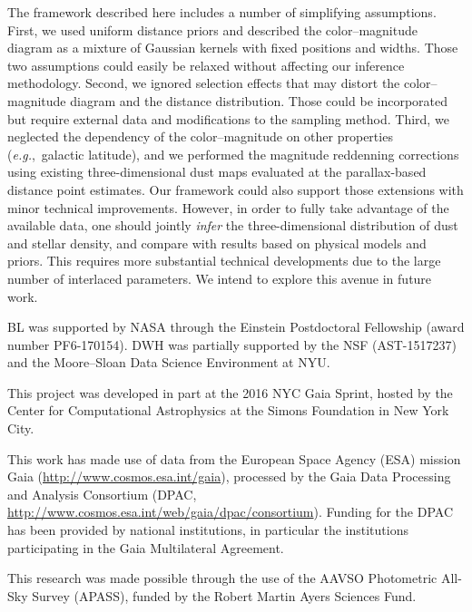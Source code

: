 \documentclass[manuscript, letterpaper]{aastex6}
\newcommand{\eg}{{\textit{e.g.},~}}
\begin{document}
The framework described here includes a number of simplifying assumptions. 
First, we used uniform distance priors and described the color--magnitude diagram as a mixture of Gaussian kernels with fixed positions and widths.
Those two assumptions could easily be relaxed without affecting our inference methodology.
Second, we ignored selection effects that may distort the color--magnitude diagram and the distance distribution.
Those could be incorporated but require external data and modifications to the sampling method.
Third, we neglected the dependency of the color--magnitude on other properties (\eg galactic latitude), and we performed the magnitude reddenning corrections using existing three-dimensional dust maps evaluated at the parallax-based distance point estimates.
Our framework could also support those extensions with minor technical improvements.
However, in order to fully take advantage of the available data, one should jointly \textit{infer} the three-dimensional distribution of dust and stellar density, and compare with results based on physical models and priors.
This requires more substantial technical developments due to the large number of interlaced parameters.
We intend to explore this avenue in future work.


\acknowledgments

BL was supported by NASA through the Einstein Postdoctoral Fellowship (award number PF6-170154).
DWH was partially supported by the NSF (AST-1517237) and the Moore--Sloan Data Science Environment at NYU.

This project was developed in part at the 2016 NYC Gaia Sprint, hosted by the Center for Computational Astrophysics at the Simons Foundation in New York City.

This work has made use of data from the European Space Agency (ESA) mission Gaia (\url{http://www.cosmos.esa.int/gaia}), processed by the Gaia Data Processing and Analysis Consortium (DPAC, \url{http://www.cosmos.esa.int/web/gaia/dpac/consortium}). Funding for the DPAC has been provided by national institutions, in particular the institutions participating in the Gaia Multilateral Agreement.

This research was made possible through the use of the AAVSO Photometric All-Sky Survey (APASS), funded by the Robert Martin Ayers Sciences Fund.







\end{document}
